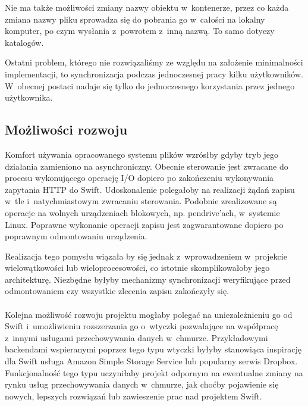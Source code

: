 Nie ma także możliwości zmiany nazwy obiektu w~kontenerze, przez co każda zmiana
nazwy pliku sprowadza się do pobrania go w~całości na lokalny komputer, po czym
wysłania z~powrotem z~inną nazwą. To samo dotyczy katalogów.

Ostatni problem, którego nie rozwiązaliśmy ze względu na założenie minimalności
implementacji, to synchronizacja podczas jednoczesnej pracy kilku użytkowników.
W~obecnej postaci \cb{} nadaje się tylko do jednoczesnego korzystania przez
jednego użytkownika.

\subsection{Możliwości rozwoju}

Komfort używania opracowanego systemu plików wzrósłby gdyby tryb jego działania
zamieniono na asynchroniczny. Obecnie sterowanie jest zwracane do procesu
wykonującego operację I/O dopiero po zakończeniu wykonywania zapytania HTTP do
Swift. Udoskonalenie polegałoby na realizacji żądań zapisu w~tle
i~natychmiastowym zwracaniu sterowania. Podobnie zrealizowane są operacje na
wolnych urządzeniach blokowych, np. pendrive'ach, w~systemie Linux. Poprawne
wykonanie operacji zapisu jest zagwarantowane dopiero po poprawnym odmontowaniu
urządzenia.

Realizacja tego pomysłu wiązała by się jednak z~wprowadzeniem w~projekcie
wielowątkowości lub wieloprocesowości, co istotnie skomplikowałoby jego
architekturę. Niezbędne byłyby mechanizmy synchronizacji weryfikujące przed
odmontowaniem czy wszystkie zlecenia zapisu zakończyły się.

\paragraph{}

Kolejna możliwość rozwoju projektu mogłaby polegać na uniezależnieniu go od
Swift i~umożliwieniu rozszerzania go o~wtyczki pozwalające na współpracę
z~innymi usługami przechowywania danych w~chmurze. Przykładowymi backendami
wspieranymi poprzez tego typu wtyczki byłyby stanowiąca inspirację dla Swift
usługa Amazon Simple Storage Service lub popularny serwis Dropbox.
Funkcjonalność tego typu uczyniłaby projekt odpornym na ewentualne zmiany na
rynku usług przechowywania danych w~chmurze, jak choćby pojawienie się nowych,
lepszych rozwiązań lub zawieszenie prac nad projektem Swift.

\paragraph{}

